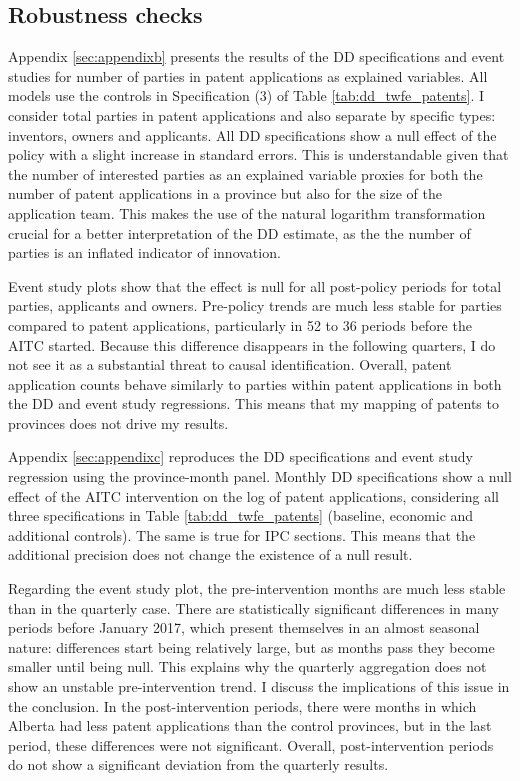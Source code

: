 \documentclass[../main.tex]{subfiles}
\begin{document}
\subsection{Robustness checks}

Appendix \ref{sec:appendixb} presents the results of the DD specifications and event studies for number of parties in patent applications as explained variables. All models use the controls in Specification (3) of Table \ref{tab:dd_twfe_patents}. I consider total parties in patent applications and also separate by specific types: inventors, owners and applicants. All DD specifications show a null effect of the policy with a slight increase in standard errors. This is understandable given that the number of interested parties as an explained variable proxies for both the number of patent applications in a province but also for the size of the application team. This makes the use of the natural logarithm transformation crucial for a better interpretation of the DD estimate, as the the number of parties is an inflated indicator of innovation. 

Event study plots show that the effect is null for all post-policy periods for total parties, applicants and owners. Pre-policy trends are much less stable for parties compared to patent applications, particularly in 52 to 36 periods before the AITC started. Because this difference disappears in the following quarters, I do not see it as a substantial threat to causal identification. Overall, patent application counts behave similarly to parties within patent applications in both the DD and event study regressions. This means that my mapping of patents to provinces does not drive my results.

Appendix \ref{sec:appendixc} reproduces the DD specifications and event study regression using the province-month panel. Monthly DD specifications show a null effect of the AITC intervention on the log of patent applications, considering all three specifications in Table \ref{tab:dd_twfe_patents} (baseline, economic and additional controls). The same is true for IPC sections. This means that the additional precision does not change the existence of a null result. 

Regarding the event study plot, the pre-intervention months are much less stable than in the quarterly case. There are statistically significant differences in many periods before January 2017, which present themselves in an almost seasonal nature: differences start being relatively large, but as months pass they become smaller until being null. This explains why the quarterly aggregation does not show an unstable pre-intervention trend. I discuss the implications of this issue in the conclusion. In the post-intervention periods, there were months in which Alberta had less patent applications than the control provinces, but in the last period, these differences were not significant. Overall, post-intervention periods do not show a significant deviation from the quarterly results.
\end{document}

